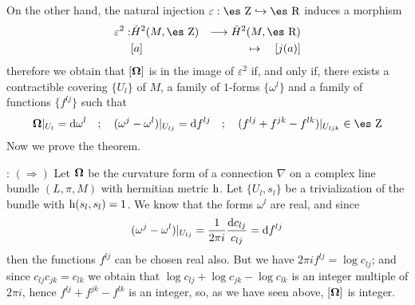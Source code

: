 \documentclass[12pt]{article}
\theoremstyle{plain}
\def\beann{\begin{eqnarray*}}
\def\eeann{\end{eqnarray*}}
\def\d{{\rm d}}
\def\h{{\rm h}}
\def\curv{{\bf \Omega}}
\def\Zahl{\mbox{\es Z}}
\def\Real{\mbox{\es R}}
\begin{document}
On the other hand, the natural injection
$\varepsilon : \Zahl \hookrightarrow \Real$ induces a morphism
\beann
\varepsilon^2:& \check{H}^2(M,\Zahl )& \longrightarrow
\check{H}^2(M,\Real )
\\
& [a] & \mapsto \quad [j(a)]
\eeann
therefore we obtain that $[\curv ]$ is in the image of $\varepsilon^2$
if, and only if, there exists a contractible covering $\{ U_l \}$ of
$M$,
a family of $1$-forms $\{ \omega^l  \}$
and a family of functions $\{ f^{l j} \}$ such that
$$
\curv \vert_{U_l} = \d \omega^l
\quad ; \quad
(\omega^j - \omega^l )\vert_{U_{l j}} = \d f^{l j}
\quad ; \quad
(f^{l j} + f^{jk} - f^{l k})\vert_{U_{l jk}} \in \Zahl
$$
Now we prove the theorem.
\medskip

: 
$(\Longrightarrow )$    \quad
Let $\curv $ be the curvature form of a connection $\nabla$
on a complex line bundle $(L,\pi ,M)$ with hermitian metric $\h$.
Let $\{ U_l,s_l \}$ be a trivialization of the bundle with $\h
(s_l,s_l)=1$.
We know that the forms $\omega^l $ are real, and since
$$
(\omega^j - \omega^l )\vert_{U_{l j}} =
\frac{1}{2\pi i} \frac{\d c_{l j}}{c_{l j}} =
\d f^{l j}
$$
then the functions $f^{l j}$ can be chosen real also.
But we have $2\pi i f^{l j} = \log c_{l j}$;
and since $c_{l j} c_{jk} = c_{l k}$ we obtain that
$\log c_{l j} + \log c_{jk} - \log c_{l k}$
is an integer multiple of $2\pi i$, hence $f^{l j} + f^{jk} - f^{l k}$
is an integer, so, as we have seen above, $[\curv ]$ is integer.
\end{document}

